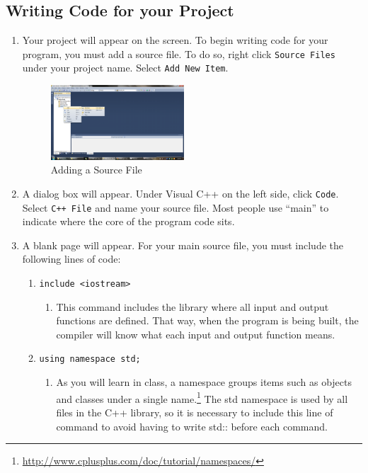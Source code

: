 \documentclass[twocolumn]{article}
\begin{document}
\subsection{Writing Code for your Project}
\begin{enumerate}
	\item Your project will appear on the screen. To begin writing code for your program, you must add a source file. To do so, right click \texttt{Source Files} under your project name. Select \texttt{Add New Item}. 	
	\begin{figure}[htbp]
		\centering
		\includegraphics[width=0.47\textwidth]{3.png}
		\caption{Adding a Source File}
		\label{fig:sourcefile}
	\end{figure}
	\item A dialog box will appear. Under Visual C++ on the left side, click \texttt{Code}. Select \texttt{C++ File} and name your source file. Most people use “main” to indicate where the core of the program code sits. 
	\item A blank page will appear. For your main source file, you must include the following lines of code:
	\begin{enumerate}
		\item \texttt{include <iostream>}
	\begin{enumerate}
	  \item This command includes the library where all input and output functions are defined. That way, when the program is being built, the compiler will know what each input and output function means.
	\end{enumerate}	
	  \item \texttt{using namespace std;}
	\begin{enumerate}
	  \item As you will learn in class, a namespace groups items such as objects and classes under a single name.\footnote{\url{http://www.cplusplus.com/doc/tutorial/namespaces/}} The std namespace is used by all files in the C++ library, so it is necessary to include this line of command to avoid having to write std:: before each command.
	\end{enumerate}

\end{enumerate}
\end{enumerate}
\end{document}
